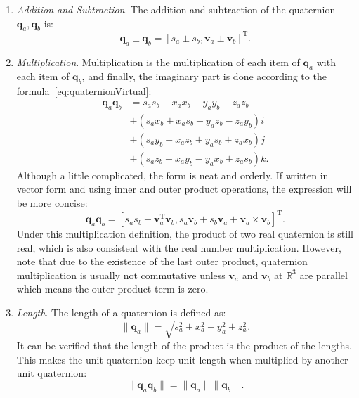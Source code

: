 \begin{enumerate}
    \item { \emph {Addition and Subtraction}.} The addition and subtraction of the quaternion $ \mathbf {q}_a, \mathbf {q}_b $ is:
    \begin{equation} 	
    \mathbf{q}_a \pm \mathbf{q}_b = \left[ s_a \pm s_b, \mathbf{v}_a \pm \mathbf{v}_b \right]^\mathrm{T}.
    \end{equation}
    \item { \emph {Multiplication}}. Multiplication is the multiplication of each item of $ \mathbf {q}_a $ with each item of $ \mathbf {q}_b $, and finally, the imaginary part is done according to the formula~\eqref {eq:quaternionVirtual}:
    \begin{equation}
    \begin{aligned}
    \mathbf{q}_a \mathbf{q}_b &= {s_a}{s_b} - {x_a}{x_b} - {y_a}{y_b} - {z_a}{z_b}\\
    &+ \left( {{s_a}{x_b} + {x_a}{s_b} + {y_a}{z_b} - {z_a}{y_b}} \right)i\\
    &+ \left( {{s_a}{y_b} - {x_a}{z_b} + {y_a}{s_b} + {z_a}{x_b}} \right)j\\
    &+ \left( {{s_a}{z_b} + {x_a}{y_b} - {y_a}{x_b} + {z_a}{s_b}} \right)k.
    \end{aligned}
    \end{equation}
    Although a little complicated, the form is neat and orderly. If written in vector form and using inner and outer product operations, the expression will be more concise:
    \begin{equation}
    \mathbf{q}_a \mathbf{q}_b = \left[ s_a s_b - \mathbf{v}_a^\mathrm{T} \mathbf{v}_b, s_a\mathbf{v}_b + s_b\mathbf{v}_a + \mathbf{v}_a \times \mathbf{v}_b \right]^\mathrm{T}.
    \end{equation}
    Under this multiplication definition, the product of two real quaternion is still real, which is also consistent with the real number multiplication. However, note that due to the existence of the last outer product, quaternion multiplication is usually not commutative unless $ \mathbf {v}_a $ and $ \mathbf {v}_b $ at $ \mathbb {R}^ 3 $ are parallel which means the outer product term is zero.
    
    \item { \emph {Length}. } The length of a quaternion is defined as:
    \begin{equation}
    \| \mathbf{q}_a \| = \sqrt{ s_a^2 + x_a^2 + y_a^2 + z_a^2 }.
    \end{equation}
    It can be verified that the length of the product is the product of the lengths. This makes the unit quaternion keep unit-length when multiplied by another unit quaternion:
    \begin{equation}
    \| \mathbf{q}_a \mathbf{q}_b \| = \|\mathbf{q}_a \| \| \mathbf{q}_b \|.
    \end{equation}
    

\end{enumerate}
